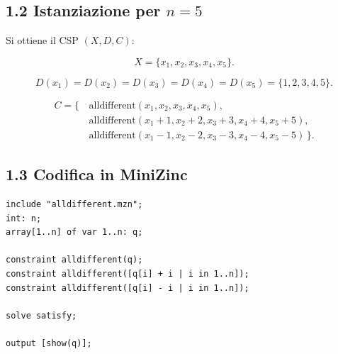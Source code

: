 \documentclass[a4paper,11pt]{article}
\begin{document}
\subsection*{1.2 Istanziazione per $n=5$}

Si ottiene il CSP $(X,D,C)$:

\[
X=\{x_1,x_2,x_3,x_4,x_5\}.
\]

\[
D(x_1)=D(x_2)=D(x_3)=D(x_4)=D(x_5)=\{1,2,3,4,5\}.
\]

\[
\begin{aligned}
C=\{\,&\text{alldifferent}(x_1,x_2,x_3,x_4,x_5),\\
      &\text{alldifferent}(x_1+1,x_2+2,x_3+3,x_4+4,x_5+5),\\
      &\text{alldifferent}(x_1-1,x_2-2,x_3-3,x_4-4,x_5-5)\,\}.
\end{aligned}
\]

\newpage

\subsection*{1.3 Codifica in MiniZinc}

\begin{lstlisting}
include "alldifferent.mzn";
int: n;
array[1..n] of var 1..n: q;

constraint alldifferent(q);
constraint alldifferent([q[i] + i | i in 1..n]);
constraint alldifferent([q[i] - i | i in 1..n]);

solve satisfy;

output [show(q)];
\end{lstlisting}
\end{document}
